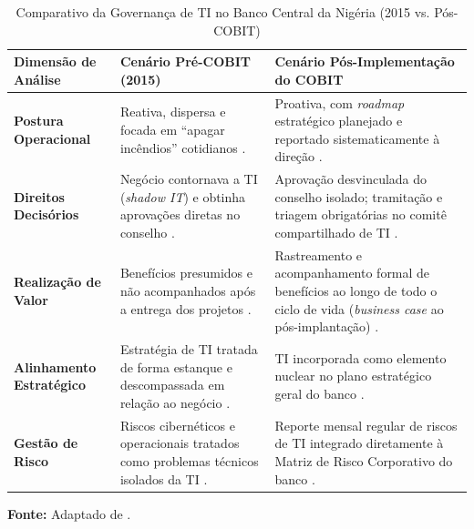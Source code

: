 \begin{table}[H]
\centering
\footnotesize
\renewcommand{\arraystretch}{1.1}
\caption{Comparativo da Governança de TI no Banco Central da Nigéria (2015 vs. Pós-COBIT)}
\label{tab:cbn-comparativo}
\begin{tabularx}{\textwidth}{|l|X|X|}
\hline
\textbf{Dimensão de Análise} & \textbf{Cenário Pré-COBIT (2015)} & \textbf{Cenário Pós-Implementação do COBIT} \\ \hline
\textbf{Postura Operacional} & Reativa, dispersa e focada em ``apagar incêndios'' cotidianos \cite{teitler2022case}. & Proativa, com \textit{roadmap} estratégico planejado e reportado sistematicamente à direção \cite{teitler2022case}. \\ \hline
\textbf{Direitos Decisórios} & Negócio contornava a TI (\textit{shadow IT}) e obtinha aprovações diretas no conselho \cite{teitler2022case}. & Aprovação desvinculada do conselho isolado; tramitação e triagem obrigatórias no comitê compartilhado de TI \cite{teitler2022case,weill2004governance}. \\ \hline
\textbf{Realização de Valor} & Benefícios presumidos e não acompanhados após a entrega dos projetos \cite{teitler2022case}. & Rastreamento e acompanhamento formal de benefícios ao longo de todo o ciclo de vida (\textit{business case} ao pós-implantação) \cite{teitler2022case}. \\ \hline
\textbf{Alinhamento Estratégico} & Estratégia de TI tratada de forma estanque e descompassada em relação ao negócio \cite{teitler2022case}. & TI incorporada como elemento nuclear no plano estratégico geral do banco \cite{teitler2022case,weill2004governance}. \\ \hline
\textbf{Gestão de Risco} & Riscos cibernéticos e operacionais tratados como problemas técnicos isolados da TI \cite{teitler2022case}. & Reporte mensal regular de riscos de TI integrado diretamente à Matriz de Risco Corporativo do banco \cite{teitler2022case}. \\ \hline
\end{tabularx}
\par\vspace{3pt}
{\footnotesize \textbf{Fonte:} Adaptado de .}
\end{table}
